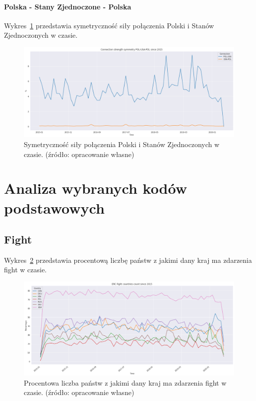 \documentclass[11pt]{report}
\begin{document}
    \paragraph{Polska - Stany Zjednoczone - Polska}

    Wykres~\ref{fig:POL-USA-POL} przedstawia symetryczność siły połączenia Polski i Stanów Zjednoczonych w czasie.


    \begin{figure}[ht!]
        \centering
        \includegraphics[width=1 \textwidth]{fig/ConnectionSymmetry/POL-USA-POL.png}
        \caption{Symetryczność siły połączenia Polski i Stanów Zjednoczonych w czasie. (źródło: opracowanie własne)}
        \label{fig:POL-USA-POL}
    \end{figure}


    \section{Analiza wybranych kodów podstawowych}

    \subsection{Fight}

    Wykres~\ref{fig:Fight} przedstawia procentową liczbę państw z jakimi dany kraj ma zdarzenia fight w czasie.


    \begin{figure}[ht!]
        \centering
        \includegraphics[width=1 \textwidth]{fig/ERC/Fight.png}
        \caption{Procentowa liczba państw z jakimi dany kraj ma zdarzenia fight w czasie. (źródło: opracowanie własne)}
        \label{fig:Fight}
    \end{figure}
\end{document}
